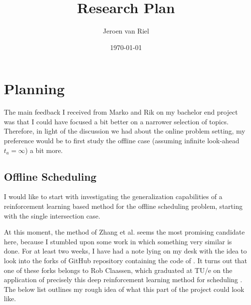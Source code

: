 \documentclass{article}
\title{Research Plan}
\author{Jeroen van Riel}
\date{\monthyeardate\today}
\theoremstyle{definition}
\theoremstyle{plain}
\begin{document}
\maketitle

\section{Planning}

The main feedback I received from Marko and Rik on my bachelor end project was
that I could have focused a bit better on a narrower selection of topics.
Therefore, in light of the discussion we had about the online problem setting,
my preference would be to first study the offline case (assuming infinite
look-ahead $t_{a} = \infty$) a bit more.

\subsection{Offline Scheduling}

I would like to start with investigating the generalization capabilities of a
reinforcement learning based method for the offline scheduling problem, starting
with the single intersection case.

At this moment, the method of Zhang et al. seems the most promising candidate
here, because I stumbled upon some work in which something very similar is done.
For at least two weeks, I have had a note lying on my desk with the idea to look
into the forks of GitHub repository containing the code of
\cite{zhangLearningDispatchJob2020}. It turns out that one of these forks
belongs to Rob Claassen, which graduated at TU/e on the application of precisely
this deep reinforcement learning method for scheduling
\cite{claassenApplicationDeepReinforcement2022}. The below list outlines my
rough idea of what this part of the project could look like.
\end{document}
